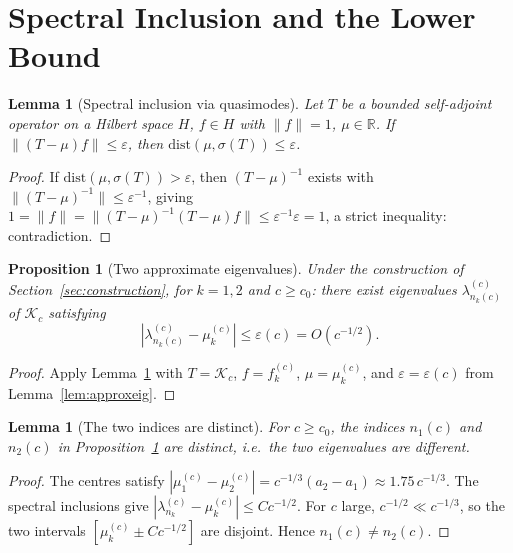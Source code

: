 \documentclass[12pt,a4paper]{amsart}
\newtheorem{lemma}[theorem]{Lemma}
\newtheorem{proposition}[theorem]{Proposition}
\theoremstyle{definition}
\newcommand{\Kc}{\mathcal{K}_c}
\newcommand{\lam}[2]{\lambda_{#2}^{(#1)}}
\newcommand{\R}{\mathbb{R}}
\newcommand{\norm}[1]{\|#1\|}
\begin{document}
\section{Spectral Inclusion and the Lower Bound}
\label{sec:spectral}

\begin{lemma}[Spectral inclusion via quasimodes]\label{lem:specinclusion}
Let $T$ be a bounded self-adjoint operator on a Hilbert space $H$,
$f \in H$ with $\norm{f}=1$, $\mu \in \R$.
If $\norm{(T-\mu)f} \leq \varepsilon$,
then $\mathrm{dist}(\mu, \sigma(T)) \leq \varepsilon$.
\end{lemma}

\begin{proof}
If $\mathrm{dist}(\mu,\sigma(T)) > \varepsilon$,
then $(T-\mu)^{-1}$ exists with $\norm{(T-\mu)^{-1}} \leq \varepsilon^{-1}$,
giving $1 = \norm{f} = \norm{(T-\mu)^{-1}(T-\mu)f} \leq \varepsilon^{-1}\varepsilon = 1$,
a strict inequality: contradiction.
\end{proof}

\begin{proposition}[Two approximate eigenvalues]\label{prop:twoeig}
Under the construction of Section~\ref{sec:construction},
for $k=1,2$ and $c \geq c_0$:
there exist eigenvalues $\lam{c}{n_k(c)}$ of $\Kc$ satisfying
\begin{equation}\label{eq:eigclose}
  |\lam{c}{n_k(c)} - \mu_k^{(c)}| \leq \varepsilon(c) = O(c^{-1/2}).
\end{equation}
\end{proposition}

\begin{proof}
Apply Lemma~\ref{lem:specinclusion} with $T = \Kc$,
$f = f_k^{(c)}$, $\mu = \mu_k^{(c)}$,
and $\varepsilon = \varepsilon(c)$ from Lemma~\ref{lem:approxeig}.
\end{proof}

\begin{lemma}[The two indices are distinct]\label{lem:distinct}
For $c \geq c_0$, the indices $n_1(c)$ and $n_2(c)$
in Proposition~\ref{prop:twoeig} are distinct,
i.e.\ the two eigenvalues are different.
\end{lemma}

\begin{proof}
The centres satisfy
$|\mu_1^{(c)} - \mu_2^{(c)}| = c^{-1/3}(a_2 - a_1) \approx 1.75\, c^{-1/3}$.
The spectral inclusions give
$|\lam{c}{n_k} - \mu_k^{(c)}| \leq C c^{-1/2}$.
For $c$ large, $c^{-1/2} \ll c^{-1/3}$, so the two intervals
$[\mu_k^{(c)} \pm C c^{-1/2}]$ are disjoint.
Hence $n_1(c) \neq n_2(c)$.
\end{proof}
\end{document}
